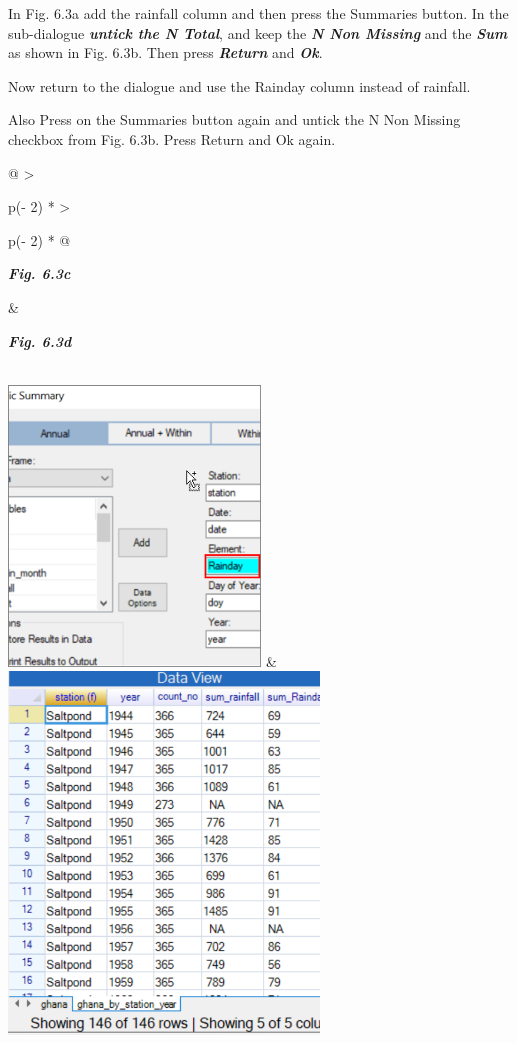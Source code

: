 \documentclass[
  letterpaper,
  DIV=11,
  numbers=noendperiod]{scrreprt}
\begin{document}
In Fig. 6.3a add the rainfall column and then press the Summaries
button. In the sub-dialogue \textbf{\emph{untick the N Total}}, and keep
the \textbf{\emph{N Non Missing}} and the \textbf{\emph{Sum}} as shown
in Fig. 6.3b. Then press \textbf{\emph{Return}} and \textbf{\emph{Ok}}.

Now return to the dialogue and use the Rainday column instead of
rainfall.

Also Press on the Summaries button again and untick the N Non Missing
checkbox from Fig. 6.3b. Press Return and Ok again.

\begin{longtable}[]{@{}
  >{\raggedright\arraybackslash}p{(\columnwidth - 2\tabcolsep) * }
  >{\raggedright\arraybackslash}p{(\columnwidth - 2\tabcolsep) * }@{}}
\toprule\noalign{}
\begin{minipage}[b]{\linewidth}\raggedright
\textbf{\emph{Fig. 6.3c}}
\end{minipage} & \begin{minipage}[b]{\linewidth}\raggedright
\textbf{\emph{Fig. 6.3d}}
\end{minipage} \\
\midrule\noalign{}
\endhead
\bottomrule\noalign{}
\endlastfoot
\includegraphics[width=2.63899in,height=2.93844in]{figures/Fig6.3c.png}
&
\includegraphics[width=3.25415in,height=3.78318in]{figures/Fig6.3d.png} \\
\end{longtable}
\end{document}
